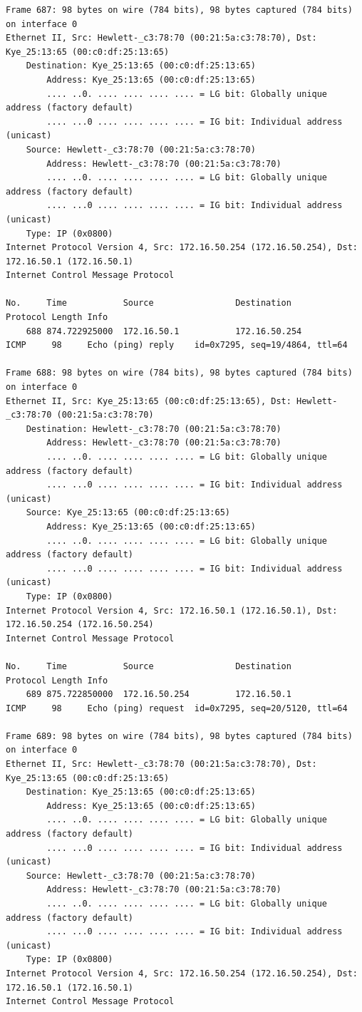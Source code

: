 \documentclass[a4paper,11pt]{article}
\begin{document}
\begin{lstlisting}
Frame 687: 98 bytes on wire (784 bits), 98 bytes captured (784 bits) on interface 0
Ethernet II, Src: Hewlett-_c3:78:70 (00:21:5a:c3:78:70), Dst: Kye_25:13:65 (00:c0:df:25:13:65)
    Destination: Kye_25:13:65 (00:c0:df:25:13:65)
        Address: Kye_25:13:65 (00:c0:df:25:13:65)
        .... ..0. .... .... .... .... = LG bit: Globally unique address (factory default)
        .... ...0 .... .... .... .... = IG bit: Individual address (unicast)
    Source: Hewlett-_c3:78:70 (00:21:5a:c3:78:70)
        Address: Hewlett-_c3:78:70 (00:21:5a:c3:78:70)
        .... ..0. .... .... .... .... = LG bit: Globally unique address (factory default)
        .... ...0 .... .... .... .... = IG bit: Individual address (unicast)
    Type: IP (0x0800)
Internet Protocol Version 4, Src: 172.16.50.254 (172.16.50.254), Dst: 172.16.50.1 (172.16.50.1)
Internet Control Message Protocol

No.     Time           Source                Destination           Protocol Length Info
    688 874.722925000  172.16.50.1           172.16.50.254         ICMP     98     Echo (ping) reply    id=0x7295, seq=19/4864, ttl=64

Frame 688: 98 bytes on wire (784 bits), 98 bytes captured (784 bits) on interface 0
Ethernet II, Src: Kye_25:13:65 (00:c0:df:25:13:65), Dst: Hewlett-_c3:78:70 (00:21:5a:c3:78:70)
    Destination: Hewlett-_c3:78:70 (00:21:5a:c3:78:70)
        Address: Hewlett-_c3:78:70 (00:21:5a:c3:78:70)
        .... ..0. .... .... .... .... = LG bit: Globally unique address (factory default)
        .... ...0 .... .... .... .... = IG bit: Individual address (unicast)
    Source: Kye_25:13:65 (00:c0:df:25:13:65)
        Address: Kye_25:13:65 (00:c0:df:25:13:65)
        .... ..0. .... .... .... .... = LG bit: Globally unique address (factory default)
        .... ...0 .... .... .... .... = IG bit: Individual address (unicast)
    Type: IP (0x0800)
Internet Protocol Version 4, Src: 172.16.50.1 (172.16.50.1), Dst: 172.16.50.254 (172.16.50.254)
Internet Control Message Protocol

No.     Time           Source                Destination           Protocol Length Info
    689 875.722850000  172.16.50.254         172.16.50.1           ICMP     98     Echo (ping) request  id=0x7295, seq=20/5120, ttl=64

Frame 689: 98 bytes on wire (784 bits), 98 bytes captured (784 bits) on interface 0
Ethernet II, Src: Hewlett-_c3:78:70 (00:21:5a:c3:78:70), Dst: Kye_25:13:65 (00:c0:df:25:13:65)
    Destination: Kye_25:13:65 (00:c0:df:25:13:65)
        Address: Kye_25:13:65 (00:c0:df:25:13:65)
        .... ..0. .... .... .... .... = LG bit: Globally unique address (factory default)
        .... ...0 .... .... .... .... = IG bit: Individual address (unicast)
    Source: Hewlett-_c3:78:70 (00:21:5a:c3:78:70)
        Address: Hewlett-_c3:78:70 (00:21:5a:c3:78:70)
        .... ..0. .... .... .... .... = LG bit: Globally unique address (factory default)
        .... ...0 .... .... .... .... = IG bit: Individual address (unicast)
    Type: IP (0x0800)
Internet Protocol Version 4, Src: 172.16.50.254 (172.16.50.254), Dst: 172.16.50.1 (172.16.50.1)
Internet Control Message Protocol


\end{lstlisting}
\end{document}
